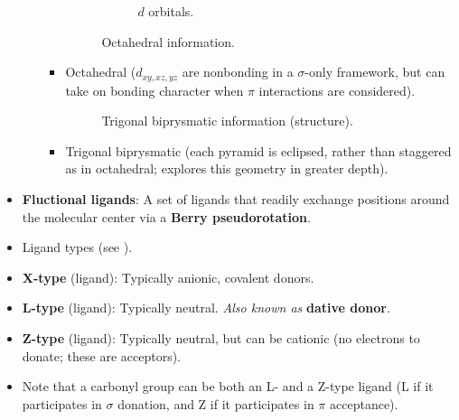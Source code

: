 \documentclass[../notes.tex]{subfiles}
\begin{document}
\begin{itemize}
\begin{itemize}
\begin{itemize}
\begin{figure}[h!]
\begin{subfigure}[b]{0.3\linewidth}
                    \caption{$d$ orbitals.}
                    \label{fig:6-octab}
                \end{subfigure}
                \caption{Octahedral information.}
                \label{fig:6-octa}
            \end{figure}
            \item Octahedral ($d_{xy,xz,yz}$ are nonbonding in a $\sigma$-only framework, but can take on bonding character when $\pi$ interactions are considered).
            \begin{figure}[h!]
                \centering
                \caption{Trigonal biprysmatic information (structure).}
                \label{fig:6-trigBiprys}
            \end{figure}
            \item Trigonal biprysmatic (each pyramid is eclipsed, rather than staggered as in octahedral; \textcite{bib:trigonalBiprysmatic} explores this geometry in greater depth).
        \end{itemize}
    \end{itemize}
    \item \textbf{Fluctional ligands}: A set of ligands that readily exchange positions around the molecular center via a \textbf{Berry pseudorotation}.
    \item Ligand types (see \textcite[93]{bib:CHEM20100Notes}).
    \item \textbf{X-type} (ligand): Typically anionic, covalent donors.
    \item \textbf{L-type} (ligand): Typically neutral. \emph{Also known as} \textbf{dative donor}.
    \item \textbf{Z-type} (ligand): Typically neutral, but can be cationic (no electrons to donate; these are acceptors).
    \item Note that a carbonyl group can be both an L- and a Z-type ligand (L if it participates in $\sigma$ donation, and Z if it participates in $\pi$ acceptance).

\end{itemize}
\end{document}
